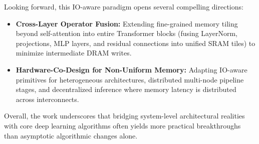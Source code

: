 \documentclass[11pt,english]{article}
\begin{document}
\begin{enumerate}[resume]
Looking forward, this IO-aware paradigm opens several compelling directions:
\begin{itemize}[noitemsep,topsep=0pt]
    \item \textbf{Cross-Layer Operator Fusion:} Extending fine-grained memory tiling beyond self-attention into entire Transformer blocks (fusing LayerNorm, projections, MLP layers, and residual connections into unified SRAM tiles) to minimize intermediate DRAM writes.
    \item \textbf{Hardware-Co-Design for Non-Uniform Memory:} Adapting IO-aware primitives for heterogeneous architectures, distributed multi-node pipeline stages, and decentralized inference where memory latency is distributed across interconnects.
\end{itemize}
Overall, the work underscores that bridging system-level architectural realities with core deep learning algorithms often yields more practical breakthroughs than asymptotic algorithmic changes alone.

\end{enumerate}
\end{document}
